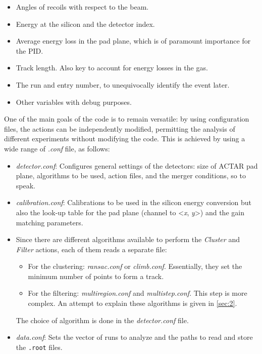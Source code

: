 \documentclass[11pt, a4paper, english]{article}
\begin{document}
\begin{enumerate}
\begin{itemize}
		\item Angles of recoils with respect to the beam. 
		\item Energy at the silicon and the detector index.
		\item Average energy loss in the pad plane, which is of paramount importance for the PID.
		\item Track length. Also key to account for energy losses in the gas.
		\item The run and entry number, to unequivocally identify the event later.
		\item Other variables with debug purposes. 
	\end{itemize}
\end{enumerate}

One of the main goals of the code is to remain versatile: by using configuration files, the actions can be independently modified, permitting the analysis of different experiments without modifying the code. 
This is achieved by using a wide range of \textit{.conf} file, as follows:
\begin{itemize}
	\item \textit{detector.conf}: Configures general settings of the detectors: size of ACTAR pad plane, algorithms to be used, action files, and the merger conditions, so to speak.
	\item \textit{calibration.conf}: Calibrations to be used in the silicon energy conversion but also the look-up table for the pad plane (channel to <\textit{x}, \textit{y}>) and the gain matching parameters.
	\item Since there are different algorithms available to perform the \textit{Cluster} and \textit{Filter} actions, each of them reads a separate file:
	\begin{itemize}
		\item For the clustering: \textit{ransac.conf} or \textit{climb.conf}. Essentially, they set the minimum number of points to form a track.
		\item For the filtering: \textit{multiregion.conf} and \textit{multistep.conf}. This step is more complex. An attempt to explain these algorithms is given in \autoref{sec:2}.
	\end{itemize}
	The choice of algorithm is done in the \textit{detector.conf} file.
	\item \textit{data.conf}: Sets the vector of runs to analyze and the paths to read and store the \lstinline|.root| files.
\end{itemize}
\end{document}
